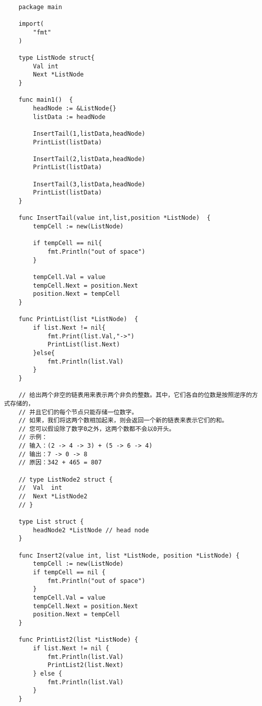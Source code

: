 \documentclass[oneside,12pt,twiside,a4paper]{ctexbook}
\begin{document}
\begin{lstlisting}
    package main

    import(
        "fmt"
    )
    
    type ListNode struct{
        Val int 
        Next *ListNode
    }
    
    func main1()  {
        headNode := &ListNode{}
        listData := headNode
    
        InsertTail(1,listData,headNode)
        PrintList(listData)
    
        InsertTail(2,listData,headNode)
        PrintList(listData)
    
        InsertTail(3,listData,headNode)
        PrintList(listData)
    }
    
    func InsertTail(value int,list,position *ListNode)  {
        tempCell := new(ListNode)
    
        if tempCell == nil{
            fmt.Println("out of space")
        }
    
        tempCell.Val = value
        tempCell.Next = position.Next
        position.Next = tempCell
    }
    
    func PrintList(list *ListNode)  {
        if list.Next != nil{
            fmt.Print(list.Val,"->")
            PrintList(list.Next)
        }else{
            fmt.Println(list.Val)
        }
    }
    
    // 给出两个非空的链表用来表示两个非负的整数。其中，它们各自的位数是按照逆序的方式存储的，
    // 并且它们的每个节点只能存储一位数字。
    // 如果，我们将这两个数相加起来，则会返回一个新的链表来表示它们的和。
    // 您可以假设除了数字0之外，这两个数都不会以0开头。
    // 示例：
    // 输入：(2 -> 4 -> 3) + (5 -> 6 -> 4)
    // 输出：7 -> 0 -> 8
    // 原因：342 + 465 = 807
    
    // type ListNode2 struct {
    // 	Val  int
    // 	Next *ListNode2
    // }
    
    type List struct {
        headNode2 *ListNode // head node
    }
    
    func Insert2(value int, list *ListNode, position *ListNode) {
        tempCell := new(ListNode)
        if tempCell == nil {
            fmt.Println("out of space")
        }
        tempCell.Val = value
        tempCell.Next = position.Next
        position.Next = tempCell
    }
    
    func PrintList2(list *ListNode) {
        if list.Next != nil {
            fmt.Println(list.Val)
            PrintList2(list.Next)
        } else {
            fmt.Println(list.Val)
        }
    }
    

\end{lstlisting}
\end{document}
